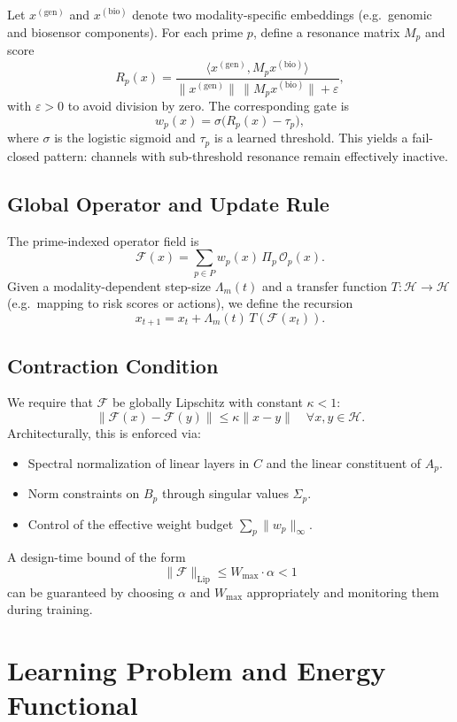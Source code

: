 \documentclass[11pt]{article}
\begin{document}
Let \(x^{(\mathrm{gen})}\) and \(x^{(\mathrm{bio})}\) denote two modality-specific embeddings (e.g.\ genomic and biosensor components).
For each prime \(p\), define a resonance matrix \(M_p\) and score
\[
  R_p(x) = \frac{\langle x^{(\mathrm{gen})}, M_p x^{(\mathrm{bio})} \rangle}{\|x^{(\mathrm{gen})}\|\,\|M_p x^{(\mathrm{bio})}\| + \varepsilon},
\]
with \(\varepsilon > 0\) to avoid division by zero.
The corresponding gate is
\[
  w_p(x) = \sigma\big(R_p(x) - \tau_p\big),
\]
where \(\sigma\) is the logistic sigmoid and \(\tau_p\) is a learned threshold.
This yields a fail-closed pattern: channels with sub-threshold resonance remain effectively inactive.

\subsection{Global Operator and Update Rule}

The prime-indexed operator field is
\[
  \mathcal{F}(x) = \sum_{p \in P} w_p(x)\,\Pi_p\,\mathcal{O}_p(x).
\]
Given a modality-dependent step-size \(\Lambda_m(t)\) and a transfer function
\(T : \mathcal{H} \to \mathcal{H}\) (e.g.\ mapping to risk scores or actions), we define the recursion
\[
  x_{t+1} = x_t + \Lambda_m(t)\,T(\mathcal{F}(x_t)).
\]

\subsection{Contraction Condition}

We require that \(\mathcal{F}\) be globally Lipschitz with constant \(\kappa < 1\):
\[
  \|\mathcal{F}(x) - \mathcal{F}(y)\|
  \leq \kappa \|x-y\|
  \quad \forall x,y \in \mathcal{H}.
\]
Architecturally, this is enforced via:
\begin{itemize}[leftmargin=*]
  \item Spectral normalization of linear layers in \(C\) and the linear constituent of \(A_p\).
  \item Norm constraints on \(B_p\) through singular values \(\Sigma_p\).
  \item Control of the effective weight budget \(\sum_p \|w_p\|_{\infty}\).
\end{itemize}
A design-time bound of the form
\[
  \|\mathcal{F}\|_{\mathrm{Lip}} \leq W_{\max} \cdot \alpha < 1
\]
can be guaranteed by choosing \(\alpha\) and \(W_{\max}\) appropriately and monitoring them during training.

\section{Learning Problem and Energy Functional}
\end{document}

